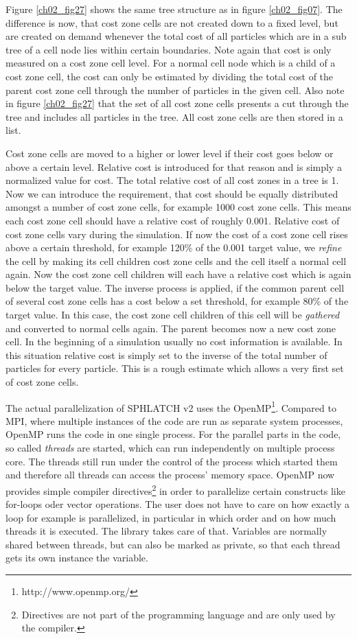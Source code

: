 Figure \ref{ch02_fig27} shows the same tree structure as in figure \ref{ch02_fig07}. The difference is now, that cost zone cells are not created down to a fixed level, but are created on demand whenever the total cost of all particles which are in a sub tree of a cell node lies within certain boundaries. Note again that cost is only measured on a cost zone cell level. For a normal cell node which is a child of a cost zone cell, the cost can only be estimated by dividing the total cost of the parent cost zone cell through the number of particles in the given cell. Also note in figure \ref{ch02_fig27} that the set of all cost zone cells presents a cut through the tree and includes all particles in the tree. All cost zone cells are then stored in a list.

Cost zone cells are moved to a higher or lower level if their cost goes below or above a certain level. Relative cost is introduced for that reason and is simply a normalized value for cost. The total relative cost of all cost zones in a tree is 1. Now we can introduce the requirement, that cost should be equally distributed amongst a number of cost zone cells, for example 1000 cost zone cells. This means each cost zone cell should have a relative cost of roughly 0.001. Relative cost of cost zone cells vary during the simulation. If now the cost of a cost zone cell rises above a certain threshold, for example 120\% of the 0.001 target value, we \emph{refine} the cell by making its cell children cost zone cells and the cell itself a normal cell again. Now the cost zone cell children will each have a relative cost which is again below the target value. The inverse process is applied, if the common parent cell of several cost zone cells has a cost below a set threshold, for example 80\% of the target value. In this case, the cost zone cell children of this cell will be \emph{gathered} and converted to normal cells again. The parent becomes now a new cost zone cell. In the beginning of a simulation usually no cost information is available. In this situation relative cost is simply set to the inverse of the total number of particles for every particle. This is a rough estimate which allows a very first set of cost zone cells. 

The actual parallelization of SPHLATCH v2 uses the OpenMP\footnote{http://www.openmp.org/}. Compared to MPI, where multiple instances of the code are run as separate system processes, OpenMP runs the code in one single process. For the parallel parts in the code, so called \emph{threads} are started, which can  run independently on multiple process core. The threads still run under the control of the process which started them and therefore all threads can access the process' memory space. OpenMP now provides simple compiler directives\footnote{Directives are not part of the programming language  and are only used by the compiler.} in order to parallelize certain constructs like for-loops oder vector operations. The user does not have to care on how exactly a loop for example is parallelized, in particular in which order and on how much threads it is executed. The library takes care of that. Variables are normally shared between threads, but can also be marked as private, so that each thread gets its own instance the variable. 

